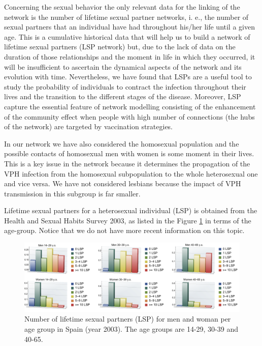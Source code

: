Concerning the sexual behavior the only relevant data for the linking of the network is the number of lifetime sexual partner networks, i. e., the number of sexual partners that an individual have had throughout his/her life until a given age. This is a cumulative historical data that will help us to build a network of lifetime sexual partners (LSP network) but, due to the lack of data on the duration of those relationships and the moment in life in which they occurred, it will be insufficient to ascertain the dynamical aspects of the network and its evolution with time. Nevertheless, we have found that LSPs are a useful tool to study the probability of individuals to contract the infection throughout their lives and the transition to the different stages of the disease. Moreover, LSP capture the essential feature of network modelling consisting of the enhancement of the community effect when people with high number of connections (the hubs of the network) are targeted by vaccination strategies.

In our network we have also considered the homosexual population and the possible contacts of homosexual men with women is some moment in their lives. This is a key issue in the network because it determines the propagation of the VPH infection from the homosexual subpopulation to the whole heterosexual one and vice versa. We have not considered lesbians because the impact of VPH transmission in this subgroup is far smaller.

Lifetime sexual partners for a heterosexual individual (LSP) is obtained from the Health and Sexual Habits Survey 2003, as listed in the Figure \ref{lsp} in terms of the age-group. Notice that we do not have more recent information on this topic.

\begin{figure}[ht]
	\includegraphics[scale=0.6]{lsp.pdf}
	\caption{Number of lifetime sexual partners (LSP) for men and woman per age group in Spain (year 2003). The age groups are 14-29, 30-39 and 40-65.}
	\label{lsp}
\end{figure}

